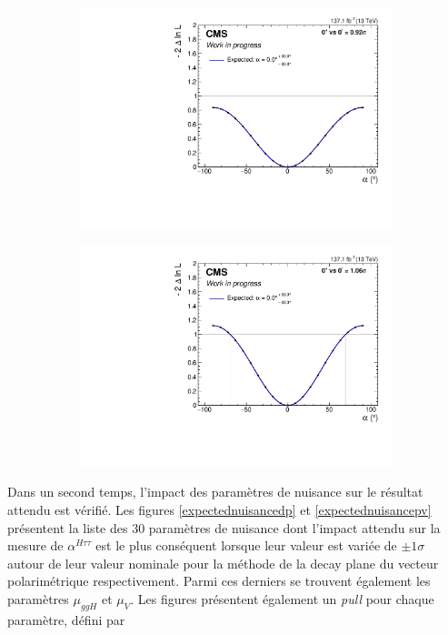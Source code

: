 \begin{figure}[!ht]
    \begin{subfigure}[b]{0.5\linewidth}
        \centering
        \includegraphics[scale=0.35]{Chapitre7/Images/alpharun2dp.pdf} 
        \caption{} 
        \vspace{0.5ex}
    \end{subfigure}
    \begin{subfigure}[b]{0.5\linewidth}
        \centering
        \includegraphics[scale=0.35]{Chapitre7/Images/alpharun2pv.pdf} 
        \caption{} 
        \vspace{0.5ex}
    \end{subfigure}
    \caption{}
    \label{expectedscan}
\end{figure}

Dans un second temps, l'impact des paramètres de nuisance sur le résultat attendu est vérifié. Les figures \ref{expectednuisancedp} et \ref{expectednuisancepv} présentent la liste des $30$ paramètres de nuisance dont l'impact attendu sur la mesure de $\alpha^{H\tau\tau}$ est le plus conséquent lorsque leur valeur est variée de $\pm1\sigma$ autour de leur valeur nominale pour la méthode de la decay plane du vecteur polarimétrique respectivement. Parmi ces derniers se trouvent également les paramètres $\mu_{ggH}$ et $\mu_V$. Les figures présentent également un \textit{pull} pour chaque paramètre, défini par 

